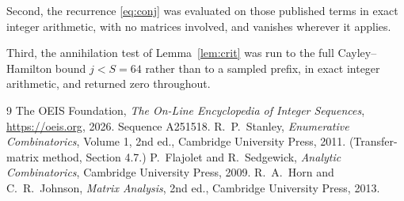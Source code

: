 \documentclass[11pt,a4paper]{article}
\theoremstyle{plain}
\theoremstyle{definition}
\begin{document}
Second, the recurrence \eqref{eq:conj} was evaluated on those published terms in exact
integer arithmetic, with no matrices involved, and vanishes wherever it applies.

Third, the annihilation test of Lemma~\ref{lem:crit} was run to the full Cayley--Hamilton
bound $j<S=64$ rather than to a sampled prefix, in exact integer arithmetic, and returned
zero throughout.

\begin{thebibliography}{9}
 The OEIS Foundation, \emph{The On-Line Encyclopedia of Integer
Sequences}, \url{https://oeis.org}, 2026. Sequence A251518.
 R.~P.~Stanley, \emph{Enumerative Combinatorics}, Volume 1, 2nd ed.,
Cambridge University Press, 2011. (Transfer-matrix method, Section 4.7.)
 P.~Flajolet and R.~Sedgewick, \emph{Analytic Combinatorics}, Cambridge
University Press, 2009.
 R.~A.~Horn and C.~R.~Johnson, \emph{Matrix Analysis}, 2nd ed., Cambridge
University Press, 2013.
\end{thebibliography}
\end{document}
